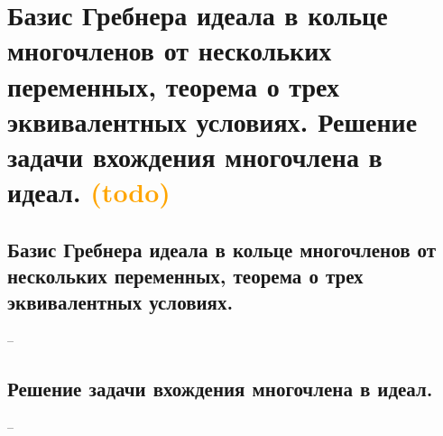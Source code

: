 \section{Базис Гребнера идеала в кольце многочленов от нескольких переменных, теорема о трех эквивалентных условиях. Решение задачи вхождения многочлена в идеал. \textcolor{orange}{(todo)}}

\subsection{Базис Гребнера идеала в кольце многочленов от нескольких переменных, теорема о трех эквивалентных условиях.}
--

\subsection{Решение задачи вхождения многочлена в идеал.}
--
